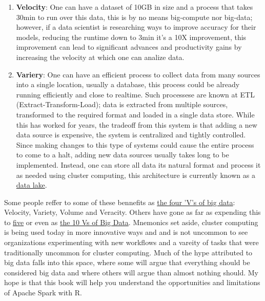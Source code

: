 \documentclass[]{book}
\theoremstyle{definition}
\theoremstyle{definition}
\theoremstyle{definition}
\theoremstyle{remark}
\begin{document}
\begin{enumerate}
\def\labelenumi{\arabic{enumi}.}
\item
  \textbf{Velocity}: One can have a dataset of 10GB in size and a
  process that takes 30min to run over this data, this is by no means
  big-compute nor big-data; however, if a data scientist is researching
  ways to improve accuracy for their models, reducing the runtime down
  to 3min it's a 10X improvement, this improvement can lead to
  significant advances and productivity gains by increasing the velocity
  at which one can analize data.
\item
  \textbf{Variery}: One can have an efficient process to collect data
  from many sources into a single location, usually a database, this
  process could be already running efficiently and close to realtime.
  Such processese are known at ETL (Extract-Transform-Load); data is
  extracted from multiple sources, transformed to the required format
  and loaded in a single data store. While this has worked for years,
  the tradeoff from this system is that adding a new data source is
  expensive, the system is centralized and tightly controlled. Since
  making changes to this type of systems could cause the entire process
  to come to a halt, adding new data sources usually takes long to be
  implemented. Instead, one can store all data its natural format and
  process it as needed using cluster computing, this architecture is
  currently known as a
  \href{https://en.wikipedia.org/wiki/Data_lake}{data lake}.
\end{enumerate}

Some people reffer to some of these bennefits as
\href{http://www.theserverside.com/feature/Handling-the-four-Vs-of-big-data-volume-velocity-variety-and-veracity}{the
four 'V's of big data}: Velocity, Variety, Volume and Veracity. Others
have gone as far as expending this to
\href{https://en.wikipedia.org/wiki/Big_data}{five} or even as
\href{https://tdwi.org/articles/2017/02/08/10-vs-of-big-data.aspx}{the
10 Vs of Big Data}. Mnemonics set aside, cluster computing is being used
today in more innovative ways and and is not uncommon to see
organizations experimenting with new workflows and a vareity of tasks
that were traditionally uncommon for cluster computing. Much of the hype
attributed to big data falls into this space, where some will argue that
everything should be considered big data and where others will argue
than almost nothing should. My hope is that this book will help you
understand the opportunities and limitations of Apache Spark with R.
\end{document}
